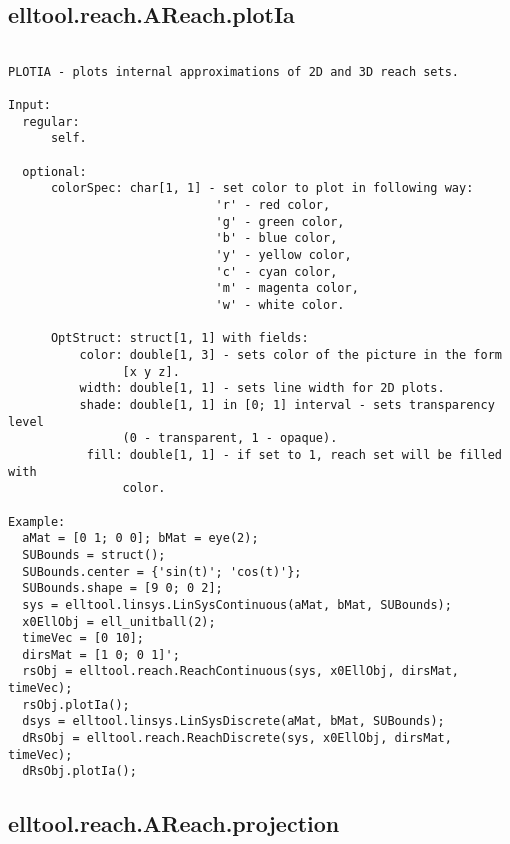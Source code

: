 \subsection{\texorpdfstring{elltool.reach.AReach.plotIa}{plotIa}}\label{method:elltool.reach.AReach.plotIa}
\begin{verbatim}

PLOTIA - plots internal approximations of 2D and 3D reach sets.

Input:
  regular:
      self.

  optional:
      colorSpec: char[1, 1] - set color to plot in following way:
                             'r' - red color,
                             'g' - green color,
                             'b' - blue color,
                             'y' - yellow color,
                             'c' - cyan color,
                             'm' - magenta color,
                             'w' - white color.

      OptStruct: struct[1, 1] with fields:
          color: double[1, 3] - sets color of the picture in the form
                [x y z].
          width: double[1, 1] - sets line width for 2D plots.
          shade: double[1, 1] in [0; 1] interval - sets transparency level
                (0 - transparent, 1 - opaque).
           fill: double[1, 1] - if set to 1, reach set will be filled with
                color.

Example:
  aMat = [0 1; 0 0]; bMat = eye(2);
  SUBounds = struct();
  SUBounds.center = {'sin(t)'; 'cos(t)'};
  SUBounds.shape = [9 0; 0 2];
  sys = elltool.linsys.LinSysContinuous(aMat, bMat, SUBounds);
  x0EllObj = ell_unitball(2);
  timeVec = [0 10];
  dirsMat = [1 0; 0 1]';
  rsObj = elltool.reach.ReachContinuous(sys, x0EllObj, dirsMat, timeVec);
  rsObj.plotIa();
  dsys = elltool.linsys.LinSysDiscrete(aMat, bMat, SUBounds);
  dRsObj = elltool.reach.ReachDiscrete(sys, x0EllObj, dirsMat, timeVec);
  dRsObj.plotIa();
\end{verbatim}
\subsection{\texorpdfstring{elltool.reach.AReach.projection}{projection}}\label{method:elltool.reach.AReach.projection}
\begin{verbatim}

\end{verbatim}
